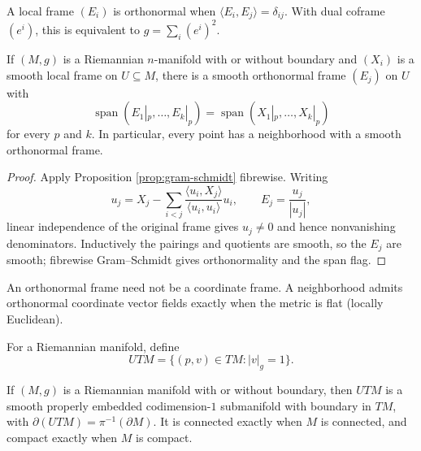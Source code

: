 A local frame $(E_i)$ is orthonormal when $\langle E_i,E_j\rangle=\delta_{ij}$. With dual coframe $(e^i)$, this is equivalent to $g=\sum_i(e^i)^2$.

\begin{proposition}
\label{prop:existence-orthonormal-frames}





If $(M,g)$ is a Riemannian $n$-manifold with or without boundary and $(X_i)$ is a smooth local frame on $U\subseteq M$, there is a smooth orthonormal frame $(E_j)$ on $U$ with
\[
\operatorname{span}(E_1|_p,\ldots,E_k|_p)=\operatorname{span}(X_1|_p,\ldots,X_k|_p)
\]
for every $p$ and $k$. In particular, every point has a neighborhood with a smooth orthonormal frame.
\end{proposition}
\begin{proof}

\sketch Apply Proposition \ref{prop:gram-schmidt} fibrewise. Writing
\[
u_j=X_j-\sum_{i<j}\frac{\langle u_i,X_j\rangle}{\langle u_i,u_i\rangle}u_i,
\qquad E_j=\frac{u_j}{|u_j|},
\]
linear independence of the original frame gives $u_j\ne0$ and hence nonvanishing denominators. Inductively the pairings and quotients are smooth, so the $E_j$ are smooth; fibrewise Gram--Schmidt gives orthonormality and the span flag.
\end{proof}

\begin{remark}
\label{rem:coordinate-frame-warning}

An orthonormal frame need not be a coordinate frame. A neighborhood admits orthonormal coordinate vector fields exactly when the metric is flat (locally Euclidean).
\end{remark}

For a Riemannian manifold, define
\[
UTM=\{(p,v)\in TM:|v|_g=1\}.\tag{2.10}
\]
\begin{proposition}
\label{prop:unit-tangent-bundle-properties}
If $(M,g)$ is a Riemannian manifold with or without boundary, then $UTM$ is a smooth properly embedded codimension-$1$ submanifold with boundary in $TM$, with $\partial(UTM)=\pi^{-1}(\partial M)$. It is connected exactly when $M$ is connected, and compact exactly when $M$ is compact.
\end{proposition}


